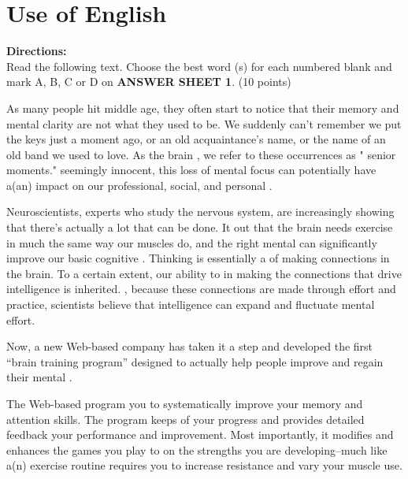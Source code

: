 


\section{ Use of English}

\textbf{Directions:}\\
 Read the following text. Choose the best word (s) for
	each numbered blank and mark A, B, C or D on \textbf{ANSWER SHEET 1}. (10
	points)



\TiGanSpace



As many people hit middle age, they often start to notice that their
memory and mental clarity are not what they used to be. We suddenly
can't remember \cloze we put the keys just a moment ago, or an
old acquaintance's name, or the name of an old band we used to love. As
the brain \cloze , we refer to these occurrences as " senior
moments." \cloze seemingly innocent, this loss of mental focus
can potentially have a(an) \cloze impact on our professional,
social, and personal \cloze.

Neuroscientists, experts who study the nervous system, are increasingly
showing that there's actually a lot that can be done. It \cloze
out that the brain needs exercise in much the same way our muscles do,
and the right mental \cloze can significantly improve our basic
cognitive \cloze. Thinking is essentially a \cloze of
making connections in the brain. To a certain extent, our ability to
\cloze in making the connections that drive intelligence is
inherited. \cloze , because these connections are made through
effort and practice, scientists believe that intelligence can expand and
fluctuate \cloze mental effort.

Now, a new Web-based company has taken it a step \cloze and
developed the first ``brain training program'' designed to actually help
people improve and regain their mental \cloze.

The Web-based program \cloze you to systematically improve your
memory and attention skills. The program keeps \cloze of your
progress and provides detailed feedback \cloze your performance
and improvement. Most importantly, it \cloze modifies and
enhances the games you play to \cloze on the strengths you are
developing--much like a(n) \cloze exercise routine requires
you to increase resistance and vary your muscle use.


\newpage

